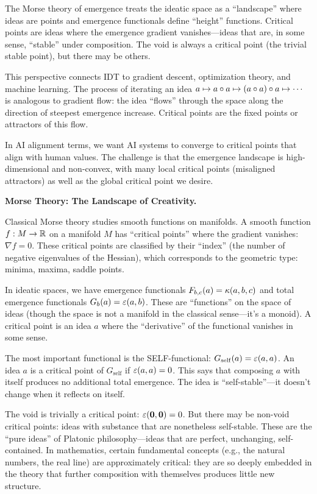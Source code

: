 \begin{interpretation}
The Morse theory of emergence treats the ideatic space as a ``landscape'' where
ideas are points and emergence functionals define ``height'' functions. Critical
points are ideas where the emergence gradient vanishes---ideas that are, in some
sense, ``stable'' under composition. The void is always a critical point (the
trivial stable point), but there may be others.

This perspective connects IDT to gradient descent, optimization theory, and
machine learning. The process of iterating an idea $a \mapsto a \circ a
\mapsto (a \circ a) \circ a \mapsto \cdots$ is analogous to gradient
flow: the idea ``flows'' through the space along the direction of steepest
emergence increase. Critical points are the fixed points or attractors of this
flow.

In AI alignment terms, we want AI systems to converge to critical points that
align with human values. The challenge is that the emergence landscape is high-
dimensional and non-convex, with many local critical points (misaligned attractors)
as well as the global critical point we desire.

\textbf{Morse Theory: The Landscape of Creativity.}

Classical Morse theory studies smooth functions on manifolds. A smooth function
$f : M \to \mathbb{R}$ on a manifold $M$ has ``critical points'' where the gradient
vanishes: $\nabla f = 0$. These critical points are classified by their ``index''
(the number of negative eigenvalues of the Hessian), which corresponds to the
geometric type: minima, maxima, saddle points.

In ideatic spaces, we have emergence functionals $F_{b,c}(a) = \kappa(a,b,c)$
and total emergence functionals $G_b(a) = \varepsilon(a,b)$. These are ``functions''
on the space of ideas (though the space is not a manifold in the classical sense---it's
a monoid). A critical point is an idea $a$ where the ``derivative'' of the
functional vanishes in some sense.

The most important functional is the SELF-functional: $G_{\mathrm{self}}(a) = \varepsilon(a,a)$.
An idea $a$ is a critical point of $G_{\mathrm{self}}$ if $\varepsilon(a,a) = 0$.
This says that composing $a$ with itself produces no additional total emergence.
The idea is ``self-stable''---it doesn't change when it reflects on itself.

The void is trivially a critical point: $\varepsilon(\mathbf{0}, \mathbf{0}) = 0$. But there
may be non-void critical points: ideas with substance that are nonetheless
self-stable. These are the ``pure ideas'' of Platonic philosophy---ideas that
are perfect, unchanging, self-contained. In mathematics, certain fundamental
concepts (e.g., the natural numbers, the real line) are approximately critical:
they are so deeply embedded in the theory that further composition with themselves
produces little new structure.


\end{interpretation}
